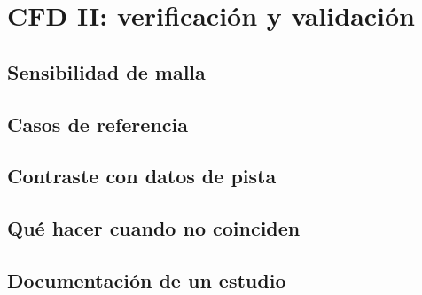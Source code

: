 \chapter{CFD II: verificación y validación}
\label{ch:cfd_validacion}

\begin{objetivos}
  \item {}
  \item {}
  \item {}
\end{objetivos}


\section{Sensibilidad de malla}
\label{sec:cfd_validacion:01}

\section{Casos de referencia}
\label{sec:cfd_validacion:02}

\section{Contraste con datos de pista}
\label{sec:cfd_validacion:03}

\section{Qué hacer cuando no coinciden}
\label{sec:cfd_validacion:04}

\section{Documentación de un estudio}
\label{sec:cfd_validacion:05}


